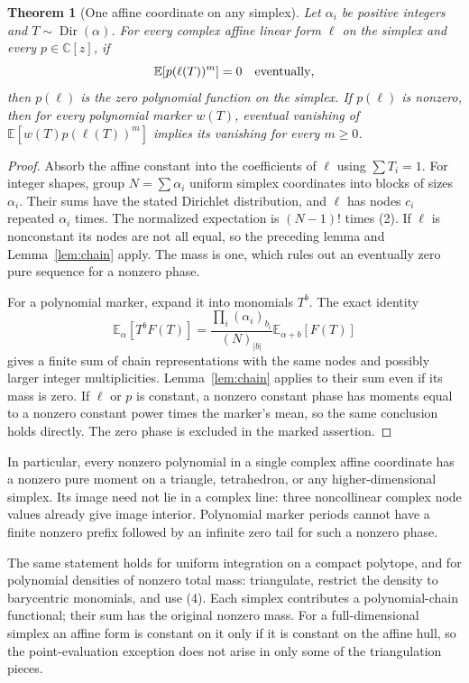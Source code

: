 \documentclass[11pt]{article}
\newtheorem{theorem}{Theorem}
\newcommand{\C}{\mathbb C}
\begin{document}
\begin{theorem}[One affine coordinate on any simplex]\label{thm:simplex}
Let $\alpha_i$ be positive integers and $T\sim\operatorname{Dir}(\alpha)$.
For every complex affine linear form $\ell$ on the simplex and every
$p\in\C[z]$, if
\[
 \mathbb E[p(\ell(T))^m]=0\quad\hbox{eventually},
\]
then $p(\ell)$ is the zero polynomial function on the simplex.
If $p(\ell)$ is nonzero, then for every polynomial marker $w(T)$,
eventual vanishing of $\mathbb E[w(T)p(\ell(T))^m]$ implies its vanishing
for every $m\ge0$.
\end{theorem}
\begin{proof}
Absorb the affine constant into the coefficients of $\ell$ using
$\sum T_i=1$. For integer shapes, group $N=\sum\alpha_i$ uniform
simplex coordinates into blocks of sizes $\alpha_i$. Their sums have
the stated Dirichlet distribution, and $\ell$ has nodes $c_i$ repeated
$\alpha_i$ times. The normalized expectation is $(N-1)!$ times (2).
If $\ell$ is nonconstant its nodes are not all equal, so the preceding
lemma and Lemma~\ref{lem:chain} apply. The mass is one, which rules out
an eventually zero pure sequence for a nonzero phase.

For a polynomial marker, expand it into monomials $T^b$. The exact identity
\[
 \mathbb E_{\alpha}[T^b F(T)]
 =\frac{\prod_i(\alpha_i)_{b_i}}{(N)_{|b|}}
   \mathbb E_{\alpha+b}[F(T)]                             \tag{4}
\]
gives a finite sum of chain representations with the same nodes and
possibly larger integer multiplicities. Lemma~\ref{lem:chain} applies to
their sum even if its mass is zero. If $\ell$ or $p$ is constant, a
nonzero constant phase has moments equal to a nonzero constant power
times the marker's mean, so the same conclusion holds directly. The
zero phase is excluded in the marked assertion.
\end{proof}

In particular, every nonzero polynomial in a single complex affine
coordinate has a nonzero pure moment on a triangle, tetrahedron, or any
higher-dimensional simplex. Its image need not lie in a complex line:
three noncollinear complex node values already give image interior.
Polynomial marker periods cannot have a finite nonzero prefix followed
by an infinite zero tail for such a nonzero phase.

The same statement holds for uniform integration on a compact polytope,
and for polynomial densities of nonzero total mass: triangulate, restrict
the density to barycentric monomials, and use (4). Each simplex contributes
a polynomial-chain functional; their sum has the original nonzero mass.
For a full-dimensional simplex an affine form is constant on it only if
it is constant on the affine hull, so the point-evaluation exception does
not arise in only some of the triangulation pieces.
\end{document}
